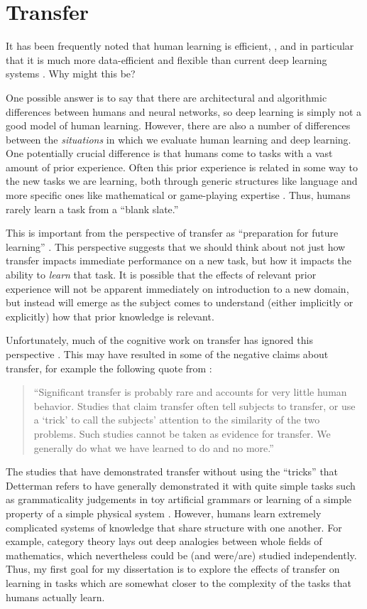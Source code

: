 \documentclass[10pt]{article}
\begin{document}
\section{Transfer}
It has been frequently noted that human learning is efficient, \citep[e.g.]{Gentner2003}, and in particular that it is much more data-efficient and flexible than current deep learning systems \citep{Lake2016}. Why might this be? \par
One possible answer is to say that there are architectural and algorithmic differences between humans and neural networks, so deep learning is simply not a good model of human learning. However, there are also a number of differences between the \emph{situations} in which we evaluate human learning and deep learning. One potentially crucial difference is that humans come to tasks with a vast amount of prior experience. Often this prior experience is related in some way to the new tasks we are learning, both through generic structures like language and more specific ones like mathematical or game-playing expertise \citep{Hansen2017}. Thus, humans rarely learn a task from a ``blank slate.'' \par
This is important from the perspective of transfer as ``preparation for future learning'' \citep{Bransford1999}. This perspective suggests that we should think about not just how transfer impacts immediate performance on a new task, but how it impacts the ability to \emph{learn} that task. It is possible that the effects of relevant prior experience will not be apparent immediately on introduction to a new domain, but instead will emerge as the subject comes to understand (either implicitly or explicitly) how that prior knowledge is relevant. \par 
Unfortunately, much of the cognitive work on transfer has ignored this perspective \citep{Bransford1999}. This may have resulted in some of the negative claims about transfer, for example the following quote from \citet{Detterman1993}: 
\begin{quote}
``Significant transfer is probably rare and accounts for very little human behavior. Studies that claim transfer often tell subjects to transfer, or use a `trick' to call the subjects' attention to the similarity of the two problems. Such studies cannot be taken as evidence for transfer. We generally do what we have learned to do and no more.''
\end{quote}
The studies that have demonstrated transfer without using the ``tricks'' that Detterman refers to have generally demonstrated it with quite simple tasks such as grammaticality judgements in toy artificial grammars \citep[e.g.]{Tunney2001} or learning of a simple property of a simple physical system \citep{Day2011}. However, humans learn extremely complicated systems of knowledge that share structure with one another. For example, category theory lays out deep analogies between whole fields of mathematics, which nevertheless could be (and were/are) studied independently. Thus, my first goal for my dissertation is to explore the effects of transfer on learning in tasks which are somewhat closer to the complexity of the tasks that humans actually learn. \par
\end{document}
